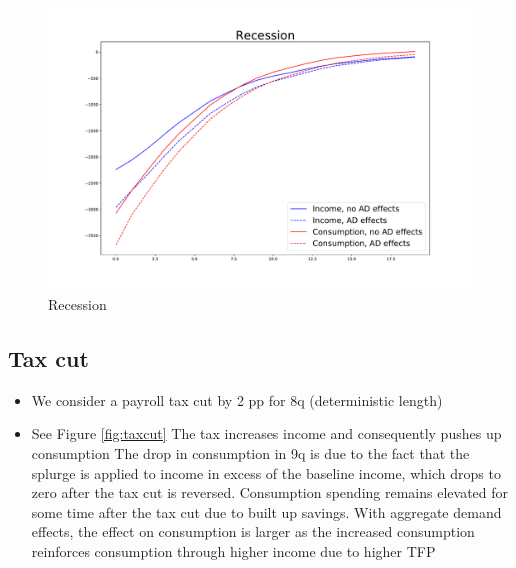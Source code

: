 \documentclass[]{article}
\begin{document}
\begin{figure} 
	\begin{centering}
		\includegraphics[width=\linewidth]{../recession.pdf}
		\caption{Recession}
		\label{fig:recession}
	\end{centering}
\end{figure}

\FloatBarrier
\subsection{Tax cut}

\begin{itemize}
	\item We consider a payroll tax cut by 2 pp for 8q (deterministic length)
	\item See Figure \ref{fig:taxcut}
	\subitem The tax increases income and consequently pushes up consumption
	\subitem The drop in consumption in 9q is due to the fact that the splurge is applied to income in excess of the baseline income, which drops to zero after the tax cut is reversed. Consumption spending remains elevated for some time after the tax cut due to built up savings. 
	\subitem With aggregate demand effects, the effect on consumption is larger as the increased consumption reinforces consumption through higher income due to higher TFP	
\end{itemize}
\end{document}
